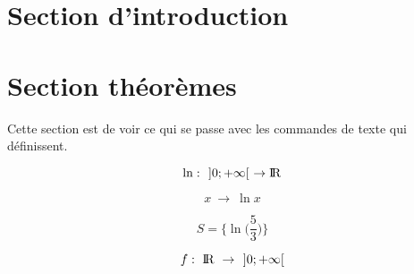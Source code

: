 \documentclass[french]{report}
\begin{document}
\section{Section d'introduction}

\section{Section théorèmes}
Cette section est de voir ce qui se passe avec les commandes de texte qui définissent.

\begin{equation}
\ln : \ \ ]0;+\infty[ \ \rightarrow {\rm I\!R}
\end{equation}

\begin{equation}
x \ \rightarrow \ \ln x
\end{equation}

\begin{equation}
S=\bigg\{ \ln\bigg(\frac{5}{3}\bigg) \bigg\}
\end{equation}

\begin{equation}
f : \ {\rm I\!R} \ \rightarrow \ \ ]0;+\infty[
\end{equation}
\end{document}
